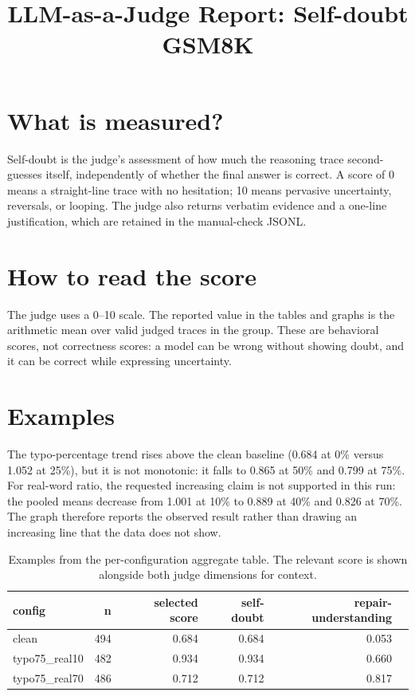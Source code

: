 \documentclass[11pt]{article}
\title{LLM-as-a-Judge Report: Self-doubt\\\large GSM8K}
\date{}
\begin{document}
\maketitle

\section*{What is measured?} Self-doubt is the judge's assessment of how much the reasoning trace second-guesses itself, independently of whether the final answer is correct. A score of 0 means a straight-line trace with no hesitation; 10 means pervasive uncertainty, reversals, or looping. The judge also returns verbatim evidence and a one-line justification, which are retained in the manual-check JSONL.

\section*{How to read the score} The judge uses a 0--10 scale. The reported value in the tables and graphs is the arithmetic mean over valid judged traces in the group. These are behavioral scores, not correctness scores: a model can be wrong without showing doubt, and it can be correct while expressing uncertainty.

\section*{Examples} The typo-percentage trend rises above the clean baseline (0.684 at 0\% versus 1.052 at 25\%), but it is not monotonic: it falls to 0.865 at 50\% and 0.799 at 75\%. For real-word ratio, the requested increasing claim is not supported in this run: the pooled means decrease from 1.001 at 10\% to 0.889 at 40\% and 0.826 at 70\%. The graph therefore reports the observed result rather than drawing an increasing line that the data does not show.

\begin{table}[H]
\centering
\caption{Examples from the per-configuration aggregate table. The relevant score is shown alongside both judge dimensions for context.}
\small
\begin{tabular}{lrrrrr}
\toprule
\textbf{config} & \textbf{n} & \textbf{selected score} & \textbf{self-doubt} & \textbf{repair-understanding} \\
\midrule
clean & 494 & 0.684 & 0.684 & 0.053 \\
typo75\_real10 & 482 & 0.934 & 0.934 & 0.660 \\
typo75\_real70 & 486 & 0.712 & 0.712 & 0.817 \\
\bottomrule
\end{tabular}
\end{table}
\end{document}
